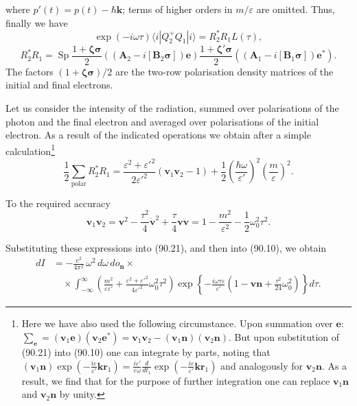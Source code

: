 
where $p'(t) = p(t) - \hbar\mathbf{k}$; terms of higher orders in $m/\varepsilon$ are omitted. Thus, finally we have
\begin{equation}
\exp(-i\omega\tau)\langle i|Q_2^+Q_1|i\rangle = R_2^* R_1 L(\tau),
\label{eq:90.21}
\end{equation}
\[
R_2^*R_1 = \operatorname{Sp}\frac{1+\boldsymbol{\zeta\sigma}}{2}((\mathbf{A}_2 - i[\mathbf{B}_2\boldsymbol{\sigma}])\mathbf{e})\frac{1+\boldsymbol{\zeta}'\boldsymbol{\sigma}}{2}((\mathbf{A}_1 - i[\mathbf{B}_1\boldsymbol{\sigma}])\mathbf{e}^*).
\]
The factors $(1+\boldsymbol{\zeta\sigma})/2$ are the two-row polarisation density matrices of the initial and final electrons.

Let us consider the intensity of the radiation, summed over polarisations of the photon and the final electron and averaged over polarisations of the initial electron. As a result of the indicated operations we obtain after a simple calculation\footnote{Here we have also used the following circumstance. Upon summation over $\mathbf{e}$:
$\sum_\mathbf{e} = (\mathbf{v}_1\mathbf{e})(\mathbf{v}_2\mathbf{e}^*) = \mathbf{v}_1\mathbf{v}_2 - (\mathbf{v}_1\mathbf{n})(\mathbf{v}_2\mathbf{n})$.
But upon substitution of (90.21) into (90.10) one can integrate by parts, noting that
$(\mathbf{v}_1\mathbf{n})\exp\!\left(-\frac{i\varepsilon}{\varepsilon'}\mathbf{kr}_1\right) = \frac{i\varepsilon'}{\varepsilon\omega}\frac{d}{dt_1}\exp\!\left(-\frac{i\varepsilon}{\varepsilon'}\mathbf{kr}_1\right)$
and analogously for $\mathbf{v}_2\mathbf{n}$. As a result, we find that for the purpose of further integration one can replace $\mathbf{v}_1\mathbf{n}$ and $\mathbf{v}_2\mathbf{n}$ by unity.}
\[
\frac{1}{2}\sum_\text{polar} R_2^*R_1 = \frac{\varepsilon^2+\varepsilon'^2}{2\varepsilon'^2}(\mathbf{v}_1\mathbf{v}_2 - 1) + \frac{1}{2}\left(\frac{\hbar\omega}{\varepsilon'}\right)^{\!2}\left(\frac{m}{\varepsilon}\right)^{\!2}.
\]

To the required accuracy
\[
\mathbf{v}_1\mathbf{v}_2 = \mathbf{v}^2 - \frac{\tau^2}{4}\dot{\mathbf{v}}^2 + \frac{\tau}{4}\mathbf{v}\ddot{\mathbf{v}} = 1 - \frac{m^2}{\varepsilon^2} - \frac{1}{2}\omega_0^2\tau^2.
\]

Substituting these expressions into (90.21), and then into (90.10), we obtain
\begin{equation}
\begin{split}
dI &= -\frac{e^2}{4\pi^2}\,\omega^2\,d\omega\,do_\mathbf{n} \times {} \\
&\quad \times \int_{-\infty}^{\infty}\left(\frac{m^2}{\varepsilon\varepsilon'} + \frac{\varepsilon^2+\varepsilon'^2}{4\varepsilon'^2}\omega_0^2\tau^2\right)\exp\!\left\{-\frac{i\omega\tau\varepsilon}{\varepsilon'}\left(1 - \mathbf{vn} + \frac{\tau^2}{24}\omega_0^2\right)\right\}d\tau.
\end{split}
\label{eq:90.22}
\end{equation}

